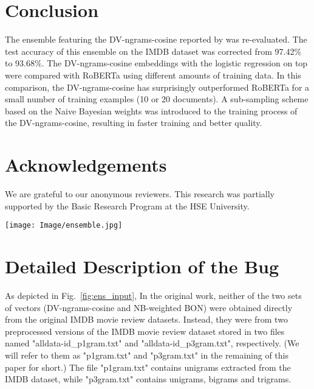 \documentclass[11pt]{article}
\begin{document}
\section{Conclusion}
The ensemble featuring the DV-ngrams-cosine reported by \citet{thongtan-phienthrakul-2019-sentiment} was re-evaluated. The test accuracy of this ensemble on the IMDB dataset was corrected from 97.42\% to 93.68\%. The DV-ngrams-cosine embeddings with the logistic regression on top were compared with RoBERTa using different amounts of training data. In this comparison, the DV-ngrams-cosine has surprisingly outperformed RoBERTa for a small number of training examples (10 or 20 documents). A sub-sampling scheme based on the Naive Bayesian weights was introduced to the training process of the DV-ngrams-cosine, resulting in faster training and better quality.

\section*{Acknowledgements}
We are grateful to our anonymous reviewers. This research was partially supported by the Basic Research Program at the HSE University.





\clearpage
\appendix

\begin{figure*}[t]
    \centering \texttt{[image: Image/ensemble.jpg]} 
    \caption{Diagram of the ensemble and its input in the original code}
    \label{fig:ens_input}
\end{figure*}

\section{Detailed Description of the Bug}
\label{sec:appendix_bug}
As depicted in Fig.~\ref{fig:ens_input}, In the original work, neither of the two sets of vectors (DV-ngrams-cosine and NB-weighted BON) were obtained directly from the original IMDB movie review datasets. Instead, they were from two preprocessed versions of the IMDB movie review dataset stored in two files named "alldata-id\_p1gram.txt" and "alldata-id\_p3gram.txt", respectively. (We will refer to them as "p1gram.txt" and "p3gram.txt" in the remaining of this paper for short.) The file "p1gram.txt" contains unigrams extracted from the IMDB dataset, while "p3gram.txt" contains unigrams, bigrams and trigrams.
\end{document}
